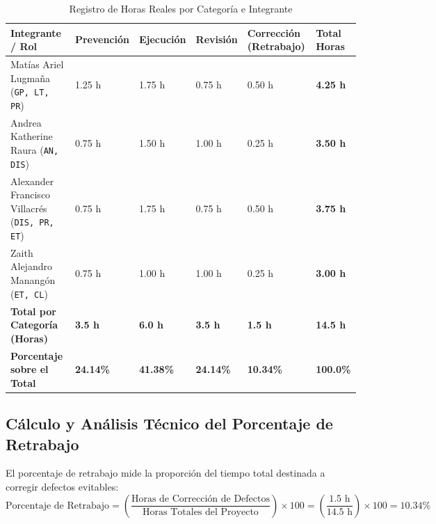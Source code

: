 \documentclass[11pt,a4paper]{article}
\begin{document}
\begin{table}[h!]
\centering
\caption{Registro de Horas Reales por Categoría e Integrante}
\label{tab:metricas}
\renewcommand{\arraystretch}{1.25}
\begin{tabular}{@{}p{4.6cm}p{1.9cm}p{1.9cm}p{1.9cm}p{2.2cm}p{1.9cm}@{}}
\toprule
\rowcolor{tableHeader}
\textbf{Integrante / Rol} & \textbf{Prevención} & \textbf{Ejecución} & \textbf{Revisión} & \textbf{Corrección (Retrabajo)} & \textbf{Total Horas} \\
\midrule
Matías Ariel Lugmaña (\texttt{GP, LT, PR}) & 1.25 h & 1.75 h & 0.75 h & 0.50 h & \textbf{4.25 h} \\
Andrea Katherine Raura (\texttt{AN, DIS}) & 0.75 h & 1.50 h & 1.00 h & 0.25 h & \textbf{3.50 h} \\
Alexander Francisco Villacrés (\texttt{DIS, PR, ET}) & 0.75 h & 1.75 h & 0.75 h & 0.50 h & \textbf{3.75 h} \\
Zaith Alejandro Manangón (\texttt{ET, CL}) & 0.75 h & 1.00 h & 1.00 h & 0.25 h & \textbf{3.00 h} \\
\midrule
\rowcolor{slateBg}
\textbf{Total por Categoría (Horas)} & \textbf{3.5 h} & \textbf{6.0 h} & \textbf{3.5 h} & \textbf{1.5 h} & \textbf{14.5 h} \\
\textbf{Porcentaje sobre el Total} & \textbf{24.14\%} & \textbf{41.38\%} & \textbf{24.14\%} & \textbf{10.34\%} & \textbf{100.0\%} \\
\bottomrule
\end{tabular}
\end{table}

\subsection{Cálculo y Análisis Técnico del Porcentaje de Retrabajo}
El porcentaje de retrabajo mide la proporción del tiempo total destinada a corregir defectos evitables:
\[
  \text{Porcentaje de Retrabajo} = \left( \frac{\text{Horas de Corrección de Defectos}}{\text{Horas Totales del Proyecto}} \right) \times 100 = \left( \frac{1.5\text{ h}}{14.5\text{ h}} \right) \times 100 = \mathbf{10.34\%}
\]
\end{document}
